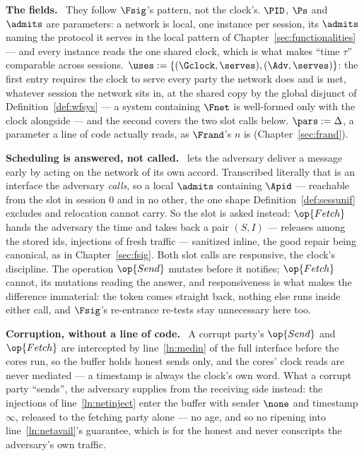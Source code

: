 \documentclass[10pt,oneside,openany]{book}
\newcommand{\heading}[1]{\medskip\par\noindent\textcolor{accent}{\textbf{#1.}}\ }
\theoremstyle{accentdef}
\theoremstyle{accentplain}
\begin{document}
\heading{The fields} They follow $\Fsig$'s pattern, not the clock's. $\PID$, $\Ps$ and $\admits$
are parameters: a network is local, one instance per session, its $\admits$ naming the protocol
it serves in the local pattern of Chapter~\ref{sec:functionalities} --- and every instance reads
the one shared clock, which is what makes ``time $\tau$'' comparable across sessions.
$\uses := \{(\Gclock,\serves),(\Adv,\serves)\}$: the first entry requires the clock to serve
every party the network does and is met, whatever session the network sits in, at the shared copy
by the global disjunct of Definition~\ref{def:wfsys} --- a system containing $\Fnet$ is
well-formed only with the clock alongside --- and the second covers the two slot calls below.
$\pars := \Delta$, a parameter a line of code actually reads, as $\Frand$'s $n$ is
(Chapter~\ref{sec:frand}).

\heading{Scheduling is answered, not called} \cite{BMTZ17} lets the adversary deliver a message
early by acting on the network of its own accord. Transcribed literally that is an interface the
adversary \emph{calls}, so a local $\admits$ containing $\Apid$ --- reachable from the slot in
session $0$ and in no other, the one shape Definition~\ref{def:sessunif} excludes and relocation
cannot carry. So the slot is asked instead: $\op{Fetch}$ hands the adversary the time and takes
back a pair $(S,I)$ --- releases among the stored ids, injections of fresh traffic --- sanitized
inline, the good repair being canonical, as in Chapter~\ref{sec:fsig}. Both slot calls are
responsive, the clock's discipline. The operation $\op{Send}$ mutates before it notifies; $\op{Fetch}$ cannot,
its mutations reading the answer, and responsiveness is what makes the difference immaterial:
the token comes straight back, nothing else runs inside either call, and $\Fsig$'s re-entrance
re-tests stay unnecessary here too.

\heading{Corruption, without a line of code} A corrupt party's $\op{Send}$ and $\op{Fetch}$ are
intercepted by line~\ref{ln:medin} of the full interface before the cores run, so the buffer
holds honest sends only, and the cores' clock reads are never mediated --- a timestamp is always
the clock's own word. What a corrupt party ``sends'', the adversary supplies from the receiving
side instead: the injections of line~\ref{ln:netinject} enter the buffer with sender $\none$ and
timestamp $\infty$, released to the fetching party alone --- no age, and so no ripening into
line~\ref{ln:netavail}'s guarantee, which is for the honest and never conscripts the adversary's
own traffic.
\end{document}
